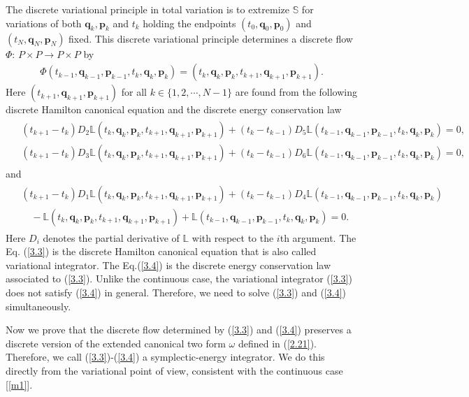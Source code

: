 \documentclass[a4paper,a4paper]{article}
\def\q{\boldsymbol{q}}
\def\p{\boldsymbol{p}}
\begin{document}
The discrete variational principle in total variation  is to
extremize $\mathbb{S}$ for variations of both $\q_{k}, \p_{k}$ and
$t_{k}$ holding the endpoints $(t_{0}, \q_{0}, \p_{0})$ and
$(t_{N}, \q_{N}, \p_{N})$ fixed. This discrete variational
principle  determines a discrete flow $\Phi:\,P\times P\to P\times
P$ by
\begin{align}
   \Phi(t_{k-1}, \q_{k-1}, \p_{k-1},  t_{k}, \q_{k}, \p_{k})
        =(t_{k}, \q_{k}, \p_{k}, t_{k+1}, \q_{k+1}, \p_{k+1}). \label{3.2}
\end{align}
Here $(t_{k+1}, \q_{k+1}, \p_{k+1})$ for all $k \in \{1, 2,
\cdots, N-1\}$ are found from the following discrete Hamilton
canonical equation  and the discrete energy conservation law
\footnotesize
\begin{align}
 \begin{split}
 &(t_{k+1}-t_{k})D_{2}\mathbb{L}(t_{k}, \q_{k}, \p_{k}, t_{k+1}, \q_{k+1}, \p_{k+1})
 +(t_{k}-t_{k-1})D_{5}\mathbb{L}(t_{k-1}, \q_{k-1}, \p_{k-1}, t_{k}, \q_{k}, \p_{k})=0,\\
&(t_{k+1}-t_{k})D_{3}\mathbb{L}(t_{k}, \q_{k}, \p_{k}, t_{k+1}, \q_{k+1}, \p_{k+1})
 +(t_{k}-t_{k-1})D_{6}\mathbb{L}(t_{k-1}, \q_{k-1}, \p_{k-1}, t_{k}, \q_{k}, \p_{k})=0,
  \end{split}
 \label{3.3}
\end{align}
\normalsize
and
\small
\begin{align}
 \begin{split}
 &(t_{k+1}-t_{k})D_{1}\mathbb{L}(t_{k}, \q_{k}, \p_{k}, t_{k+1}, \q_{k+1}, \p_{k+1})
   +(t_{k}-t_{k-1})D_{4}\mathbb{L}(t_{k-1}, \q_{k-1}, \p_{k-1}, t_{k}, \q_{k}, \p_{k}) \\
 &\quad -\mathbb{L}(t_{k}, \q_{k}, \p_{k}, t_{k+1}, \q_{k+1}, \p_{k+1})+
\mathbb{L}(t_{k-1}, \q_{k-1}, \p_{k-1}, t_{k}, \q_{k}, \p_{k})=0.
\end{split}\label{3.4}
\end{align}
\normalsize
 Here $D_{i}$ denotes the partial derivative of
$\mathbb{L}$ with respect to the $i$th argument. The Eq.
(\ref{3.3}) is the discrete Hamilton canonical  equation that is 
also called variational integrator. The Eq.(\ref{3.4}) is the discrete
energy conservation law associated to (\ref{3.3}). Unlike the
continuous case, the variational integrator (\ref{3.3}) does not
satisfy (\ref{3.4}) in general. Therefore, we need to solve
(\ref{3.3}) and (\ref{3.4}) simultaneously.

Now we prove that the discrete flow  determined by (\ref{3.3}) and
(\ref{3.4})
 preserves a discrete version of the
extended canonical two form $\omega$ defined in (\ref{2.21}). Therefore, we call  (\ref{3.3})-(\ref{3.4})
 a symplectic-energy integrator. We do this directly
from the variational point of view, consistent with the continuous case [\ref{m1}].
\end{document}
